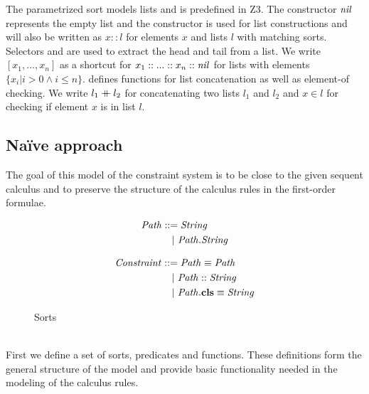 The parametrized sort  models lists and
is predefined in Z3.
The constructor $\mathit{nil}$ represents the empty list and
the constructor  is used for list constructions
and  will also be written as $x :: l$
for elements $x$ and lists $l$ with matching sorts.
Selectors  and  are used to extract
the head and tail from a list.
We write $[x_1, ..., x_n]$ as a shortcut for
$x_1 :: ... :: x_n :: \mathit{nil}$ for lists with elements $\{x_i | i > 0 \land i \leq n\}$.
 defines functions for list concatenation
as well as element-of checking.
We write $l_1 \mathbin{+\mkern-10mu+} l_2$ for concatenating two lists $l_1$ and $l_2$
and $x \in l$ for checking if element $x$ is in list $l$.

\subsection{Na\"ive approach}
The goal of this model of the constraint system is to
be close to the given sequent calculus and to preserve
the structure of the calculus rules in the first-order formulae.\\
\begin{figure}[t]
\centering
\begin{subfigure}[c]{0.45\textwidth}
\begin{align*}
\mathit{Path} &::=
     \mathit{String}\\
  &\quad|\ \mathit{Path.String}
\end{align*}
\end{subfigure}
\begin{subfigure}[c]{0.45\textwidth}
\begin{align*}
\mathit{Constraint} &::=
     \mathit{Path} \equiv \mathit{Path}\\
  &\quad|\ \mathit{Path} :: \mathit{String}\\
  &\quad|\ \mathit{Path}.\textbf{cls} \equiv \mathit{String}
\end{align*}
\end{subfigure}
\caption{Sorts}
\label{subfig:axioms-naive-general-sorts}
\end{figure}\\
First we define a set of sorts, predicates and functions.
These definitions form the general structure of the model
and provide basic functionality needed in the modeling of the calculus rules.

